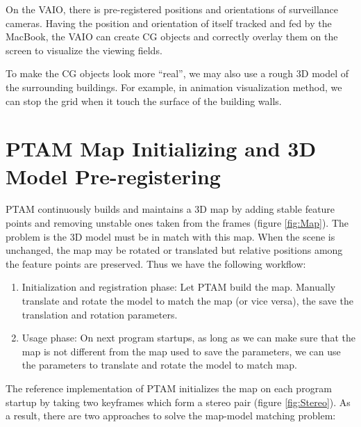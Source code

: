 On the VAIO, there is pre-registered positions and orientations of surveillance cameras. Having the position and orientation of itself tracked and fed by the MacBook, the VAIO can create CG objects and correctly overlay them on the screen to visualize the viewing fields.

To make the CG objects look more ``real'', we may also use a rough 3D model of the surrounding buildings. For example, in animation visualization method, we can stop the grid when it touch the surface of the building walls.


\section{PTAM Map Initializing and 3D Model Pre-registering}
\label{MapInitializing}

PTAM continuously builds and maintains a 3D map by adding stable feature points and removing unstable ones taken from the frames (figure \ref{fig:Map}). The problem is the 3D model must be in match with this map. When the scene is unchanged, the map may be rotated or translated but relative positions among the feature points are preserved. Thus we have the following workflow:

\begin{enumerate}
	\item Initialization and registration phase: Let PTAM build the map. Manually translate and rotate the model to match the map (or vice versa), the save the translation and rotation parameters.
	\item Usage phase: On next program startups, as long as we can make sure that the map is not different from the map used to save the parameters, we can use the parameters to translate and rotate the model to match map.
\end{enumerate}

The reference implementation of PTAM initializes the map on each program startup by taking two keyframes which form a stereo pair (figure \ref{fig:Stereo}). As a result, there are two approaches to solve the map-model matching problem:

